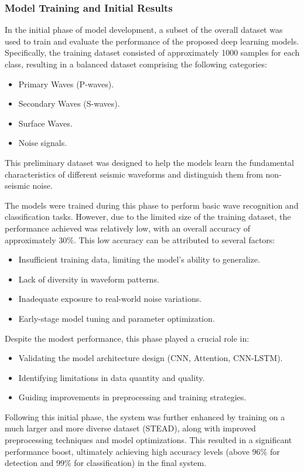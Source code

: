 \documentclass[a4paper,12pt]{report}
\begin{document}
\subsubsection{Model Training and Initial Results}
In the initial phase of model development, a subset of the overall dataset was used to train and evaluate the performance of the proposed deep learning models. Specifically, the training dataset consisted of approximately 1000 samples for each class, resulting in a balanced dataset comprising the following categories:
\begin{itemize}
\item Primary Waves (P-waves).
\item Secondary Waves (S-waves).
\item Surface Waves.
\item Noise signals.
\end{itemize}

This preliminary dataset was designed to help the models learn the fundamental characteristics of different seismic waveforms and distinguish them from non-seismic noise.

The models were trained during this phase to perform basic wave recognition and classification tasks. However, due to the limited size of the training dataset, the performance achieved was relatively low, with an overall accuracy of approximately 30\%. This low accuracy can be attributed to several factors:
\begin{itemize}
\item Insufficient training data, limiting the model's ability to generalize.
\item Lack of diversity in waveform patterns.
\item Inadequate exposure to real-world noise variations.
\item Early-stage model tuning and parameter optimization.
\end{itemize}

Despite the modest performance, this phase played a crucial role in:
\begin{itemize}
\item Validating the model architecture design (CNN, Attention, CNN-LSTM).
\item Identifying limitations in data quantity and quality.
\item Guiding improvements in preprocessing and training strategies.
\end{itemize}

Following this initial phase, the system was further enhanced by training on a much larger and more diverse dataset (STEAD), along with improved preprocessing techniques and model optimizations. This resulted in a significant performance boost, ultimately achieving high accuracy levels (above 96\% for detection and 99\% for classification) in the final system.
\end{document}
